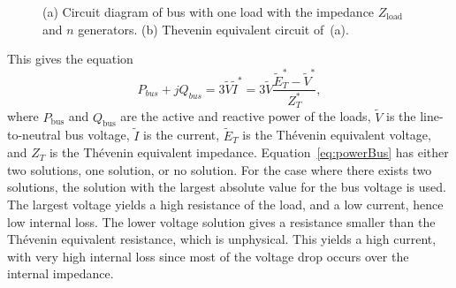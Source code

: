 \documentclass[journal]{IEEEtran}
\begin{document}
\begin{figure}
\centering
{}
\caption{(a) Circuit diagram of bus with one load with the impedance $Z_\mathrm{load}$ and $n$ generators. (b) Thevenin equivalent circuit of~(a).}

\end{figure}
This gives the equation 
\begin{equation}
P_{bus}+j Q_{bus} = 3 \tilde{V} \tilde{I}^* = 3 \tilde{V} \frac{\tilde{E}^*_T-\tilde{V}^*}{Z_T^*},
\label{eq:powerBus}
\end{equation}
where $P_\mathrm{bus}$ and $Q_\mathrm{bus}$ are the active and reactive power of the loads, $\tilde{V}$ is the line-to-neutral bus voltage, $\tilde{I}$ is the current, $\tilde{E}_T$ is the Th\'{e}venin equivalent voltage, and $Z_T$ is the Th\'{e}venin equivalent impedance.
Equation~\eqref{eq:powerBus} has either two solutions, one solution, or no solution.
For the case where there exists two solutions, the solution with the largest absolute value for the bus voltage is used.
The largest voltage yields a high resistance of the load, and a low current, hence low internal loss.
The lower voltage solution gives a resistance smaller than the Th\'{e}venin equivalent resistance, which is unphysical.
This yields a high current, with very high internal loss since most of the voltage drop occurs over the internal impedance.
\end{document}
